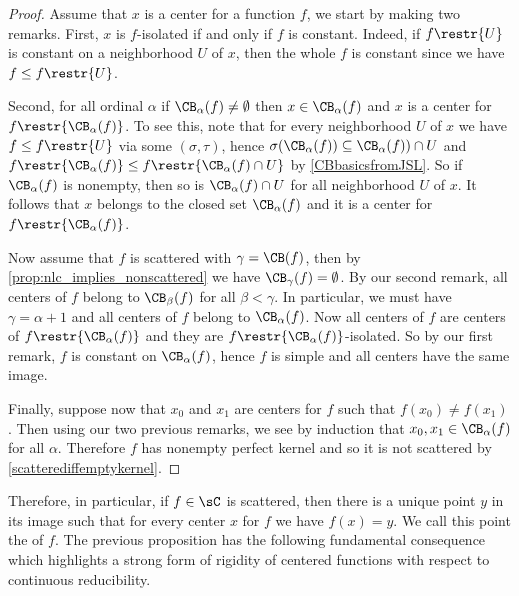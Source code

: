 \begin{proof}
Assume that $x$ is a center for a function $f$, we start by making two remarks. First, $x$ is $f$-isolated if and only if $f$ is constant. Indeed, if $f\restr{U}$ is constant on a neighborhood $U$ of $x$, then the whole $f$ is constant since we have $f\leq f\restr{U}$.

Second, for all ordinal $\alpha$ if $\CB_\alpha(f)\neq \emptyset$ then $x\in \CB_\alpha(f)$ and $x$ is a center for $f\restr{\CB_\alpha(f)}$. To see this, note that for every neighborhood $U$ of $x$ we have $f\leq f\restr{U}$ via some $(\sigma,\tau)$, hence $\sigma(\CB_\alpha(f))\subseteq \CB_\alpha(f))\cap U$ and $f\restr{\CB_\alpha(f)}\leq f\restr{\CB_\alpha(f)\cap U}$ by \cref{CBbasicsfromJSL}. So if $\CB_\alpha(f)$ is nonempty, then so is $\CB_\alpha(f)\cap U$ for all neighborhood $U$ of $x$. It follows that $x$ belongs to the closed set $\CB_\alpha(f)$ and it is a center for $f\restr{\CB_\alpha(f)}$. 

Now assume that $f$ is scattered with $\gamma=\CB(f)$, then by \cref{prop:nlc_implies_nonscattered} we have $\CB_\gamma(f)=\emptyset$. By our second remark, all centers of $f$ belong to $\CB_{\beta}(f)$ for all $\beta<\gamma$. In particular, we must have $\gamma=\alpha+1$ and all centers of $f$ belong to $\CB_\alpha(f)$. Now all centers of $f$ are centers of $f\restr{\CB_\alpha(f)}$ and they are $f\restr{\CB_\alpha(f)}$-isolated. So by our first remark, $f$ is constant on $\CB_\alpha(f)$, hence $f$ is simple and all centers have the same image.

Finally, suppose now that $x_0$ and $x_1$ are centers for $f$ such that $f(x_0)\neq f(x_1)$.
Then using our two previous remarks, we see by induction that $x_0,x_1\in\CB_\alpha(f)$ for all $\alpha$. Therefore $f$ has nonempty perfect kernel and so it is not scattered by \cref{scatterediffemptykernel}.
\end{proof}


Therefore, in particular, if $f\in\sC$ is scattered, then there is a unique point $y$ in its image such that for every center $x$ for $f$ we have $f(x)=y$.
We call this point the {\emph{\cocenter{}}} of $f$.
The previous proposition has the following fundamental consequence which highlights a strong form of rigidity of centered functions with respect to continuous reducibility.

